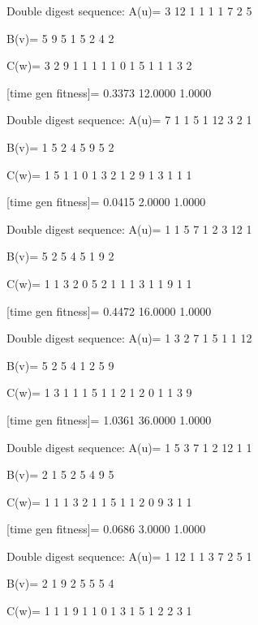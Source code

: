 Double digest sequence:
A(u)=
     3    12     1     1     1     1     7     2     5

B(v)=
     5     9     5     1     5     2     4     2

C(w)=
     3     2     9     1     1     1     1     1     0     1     5     1     1     1     3     2

[time gen fitness]=
    0.3373   12.0000    1.0000

Double digest sequence:
A(u)=
     7     1     1     5     1    12     3     2     1

B(v)=
     1     5     2     4     5     9     5     2

C(w)=
     1     5     1     1     0     1     3     2     1     2     9     1     3     1     1     1

[time gen fitness]=
    0.0415    2.0000    1.0000

Double digest sequence:
A(u)=
     1     1     5     7     1     2     3    12     1

B(v)=
     5     2     5     4     5     1     9     2

C(w)=
     1     1     3     2     0     5     2     1     1     1     3     1     1     9     1     1

[time gen fitness]=
    0.4472   16.0000    1.0000

Double digest sequence:
A(u)=
     1     3     2     7     1     5     1     1    12

B(v)=
     5     2     5     4     1     2     5     9

C(w)=
     1     3     1     1     1     5     1     1     2     1     2     0     1     1     3     9

[time gen fitness]=
    1.0361   36.0000    1.0000

Double digest sequence:
A(u)=
     1     5     3     7     1     2    12     1     1

B(v)=
     2     1     5     2     5     4     9     5

C(w)=
     1     1     1     3     2     1     1     5     1     1     2     0     9     3     1     1

[time gen fitness]=
    0.0686    3.0000    1.0000

Double digest sequence:
A(u)=
     1    12     1     1     3     7     2     5     1

B(v)=
     2     1     9     2     5     5     5     4

C(w)=
     1     1     1     9     1     1     0     1     3     1     5     1     2     2     3     1

